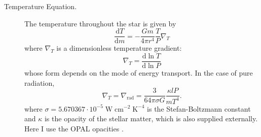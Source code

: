 \begin{description}
    
    
    \item[Temperature Equation.]
    The temperature throughout the star is given by 
    \begin{equation} \label{eq:temperature} \boxed{
        \frac{\text{d}T}{\text{d}m}
        =
        -\frac{Gm}{4\pi r^4} \frac{T}{P} \nabla_T
    }\end{equation}
    where $\nabla_T$ is a dimensionless temperature gradient:
    \begin{equation}
        \nabla_T 
        =
        \frac{\text{d}\ln T}{\text{d}\ln P}
    \end{equation}
    whose form depends on the mode of energy transport. 
    In the case of pure radiation,
    \begin{equation} \label{eq:radiative-gradiant}
        \nabla_T 
        = 
        \nabla_{\text{rad}} 
        =
        \frac{3}{64\pi \sigma G}
        \frac{\kappa l P}{m T^4}.
    \end{equation}
    where ${\sigma = 5.670367 \cdot 10^{-5} \; \text{W}\; \text{cm}^{-2}\; \text{K}^{-4}}$ is the Stefan-Boltzmann constant and $\kappa$ is the opacity of the stellar matter, which is also supplied externally. 
    Here I use the \textsc{OPAL} opacities \citep{1996ApJ...464..943I}. 
    

\end{description}

